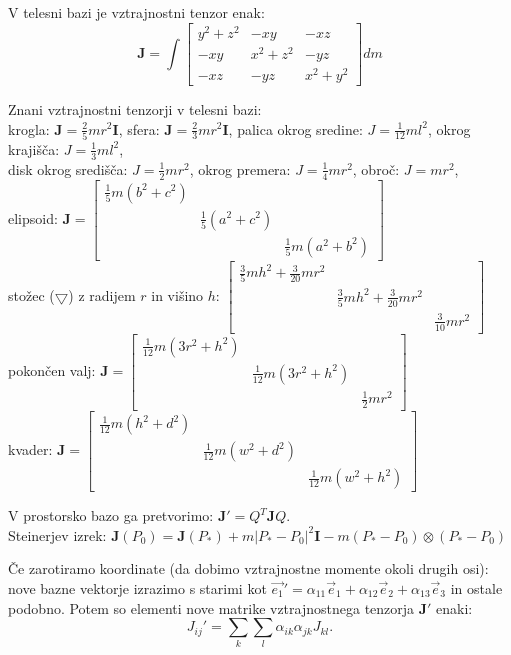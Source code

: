 \documentclass[a4paper,10pt]{article}
\theoremstyle{definition}
\newcommand{\Pt}{P_{\ast}}
\begin{document}
V telesni bazi je vztrajnostni tenzor enak:
\[ \mathbf{J} = \int
  \begin{bmatrix}
    y^2 + z^2 & -xy & -xz \\
    -xy & x^2 + z^2 & -yz \\
    -xz & -yz & x^2 + y^2
\end{bmatrix} dm \]

Znani vztrajnostni tenzorji v telesni bazi: \\
krogla: $\mathbf{J} = \frac25mr^2\mathbf I$, sfera: $\mathbf{J} = \frac23mr^2\mathbf I$, palica okrog sredine:
$J = \frac{1}{12}ml^2$, okrog krajišča: $J = \frac{1}{3}ml^2$, \\disk okrog
središča: $J = \frac12mr^2$, okrog premera: $J = \frac14mr^2$, obroč: $J = mr^2$, \\
elipsoid: $\mathbf{J} =
\begin{bmatrix}
  \frac15m(b^2+c^2) & & \\ & \frac15(a^2+c^2) & \\ & & \frac15m(a^2+b^2)
\end{bmatrix}$ \\
stožec ($\bigtriangledown$) z radijem $r$ in višino $h$:
$\begin{bmatrix}
  \frac35 mh^2+\frac{3}{20}mr^2 & & \\ & \frac35mh^2 + \frac{3}{20}mr^2 & \\
  & & \frac{3}{10}mr^2
\end{bmatrix}$ \\
pokončen valj:
$\mathbf{J} = \begin{bmatrix}
  \frac{1}{12}m(3r^2+h^2) & & \\ & \frac{1}{12}m(3r^2 + h^2) & \\ & &
  \frac12 mr^2
\end{bmatrix}$ \\
kvader:
$\mathbf{J} = \begin{bmatrix}
  \frac{1}{12}m(h^2+d^2) &  &  \\  & \frac{1}{12}m(w^2+d^2) &  \\  &  &
  \frac{1}{12}m(w^2 + h^2)
\end{bmatrix}$

V prostorsko bazo ga pretvorimo: $\mathbf{J}' = Q^T\mathbf{J}Q$. \\
Steinerjev izrek: $\mathbf{J}(P_0) = \mathbf{J}(\Pt) + m|\Pt - P_0|^2\mathbf{I} - m(\Pt - P_0) \otimes (\Pt
- P_0)$

Če zarotiramo koordinate (da dobimo vztrajnostne momente okoli drugih osi): nove
bazne vektorje izrazimo s starimi kot $\vec{e_1}' = \alpha_{11} \vec{e}_1 +
\alpha_{12} \vec{e}_2 + \alpha_{13} \vec{e}_3$ in ostale podobno. Potem so
elementi nove matrike vztrajnostnega tenzorja $\mathbf{J}'$ enaki:
$${J}_{ij}' = \sum_k \sum_l \alpha_{ik} \alpha_{jk}{J}_{kl}.$$
\end{document}
